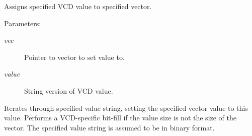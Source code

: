 Assigns specified VCD value to specified vector.

\begin{Desc}
\item[Parameters: ]\par
\begin{description}
\item[{\em 
vec}]Pointer to vector to set value to. \item[{\em 
value}]String version of VCD value.\end{description}
\end{Desc}
Iterates through specified value string, setting the specified vector value to this value. Performs a VCD-specific bit-fill if the value size is not the size of the vector. The specified value string is assumed to be in binary format. 